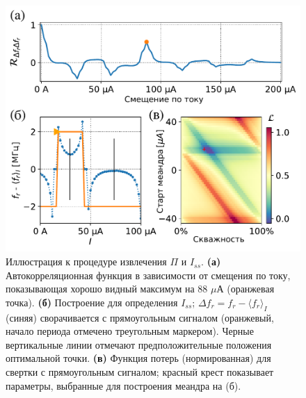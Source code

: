 \documentclass[14pt, a4paper]{extreport}
\numberwithin{equation}{section}
\begin{document}
\begin{figure}[t]
	\centering
	\includegraphics[width=0.7\linewidth]{Pictures/per_phase}
	\caption{Иллюстрация к процедуре извлечения $\Pi$ и $I_{ss}$. \textbf{(а)} Автокорреляционная функция в зависимости от смещения по току, показывающая хорошо видный максимум на 88 $\mu$А (оранжевая точка). \textbf{(б)} Построение для определения $I_{ss}$; $\Delta f_r = f_r-\langle f_r \rangle_{I}$ (синяя) сворачивается с прямоугольным сигналом (оранжевый, начало периода отмечено треугольным маркером). Черные вертикальные линии отмечают предположительные положения оптимальной точки. \textbf{(в)} Функция потерь (нормированная) для свертки с прямоугольным сигналом; красный крест показывает параметры, выбранные для построения меандра на (б).}
	\label{fig:perphase}
\end{figure}
\end{document}
